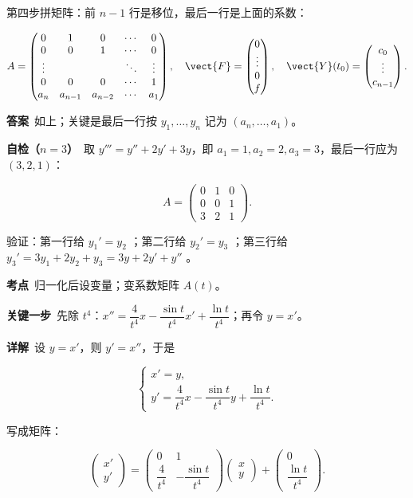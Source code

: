 \documentclass[11pt]{ctexart}
\renewcommand{\qbreak}{\needspace{0.26\textheight}}
\newcommand{\qpagebreak}{\needspace{0.92\textheight}}
\newcommand{\mat}[1]{\begin{pmatrix}#1\end{pmatrix}}
\begin{document}
第四步拼矩阵：前 $n-1$ 行是移位，最后一行是上面的系数：

\[
A=\begin{pmatrix}
0&1&0&\cdots&0\\
0&0&1&\cdots&0\\
\vdots& & &\ddots&\vdots\\
0&0&0&\cdots&1\\
a_n&a_{n-1}&a_{n-2}&\cdots&a_1
\end{pmatrix},\quad
\vect{F}=\mat{0\\ \vdots\\ 0\\ f},\quad
\vect{Y}(t_0)=\mat{c_0\\ \vdots\\ c_{n-1}}.
\]

\textbf{答案}\ 如上；关键是最后一行按 $y_1,\dots,y_n$ 记为 $(a_n,\dots,a_1)$。

\textbf{自检（$n=3$）}\ 取 $y'''=y''+2y'+3y$，即 $a_1=1,a_2=2,a_3=3$，最后一行应为 $(3,2,1)$：

\[
A=\mat{0&1&0\\0&0&1\\3&2&1}.
\]

验证：第一行给 $y_1'=y_2$ ；第二行给 $y_2'=y_3$ ；第三行给 $y_3'=3y_1+2y_2+y_3=3y+2y'+y''$ 。

\qpagebreak
{}
\label{c1:app:a7}

\qbreak
{}

\textbf{考点}\ 归一化后设变量；变系数矩阵 $A(t)$。

\textbf{关键一步}\ 先除 $t^4$：$x''=\dfrac{4}{t^4}x-\dfrac{\sin t}{t^4}x'+\dfrac{\ln t}{t^4}$；再令 $y=x'$。

\textbf{详解}\ 设 $y=x'$，则 $y'=x''$，于是

\[
\begin{cases}
x'=y,\\[3pt]
y'=\dfrac{4}{t^4}x-\dfrac{\sin t}{t^4}y+\dfrac{\ln t}{t^4}.
\end{cases}
\]

写成矩阵：

\[
\mat{x'\\ y'}=\mat{0&1\\[2pt] \dfrac{4}{t^4}&-\dfrac{\sin t}{t^4}}\mat{x\\ y}+\mat{0\\[2pt]\dfrac{\ln t}{t^4}}.
\]
\end{document}
